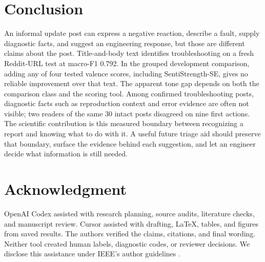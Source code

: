 \documentclass[conference,letterpaper]{IEEEtran}
\begin{document}
\section{Conclusion}
An informal update post can express a negative reaction, describe a fault, supply diagnostic facts, and suggest an engineering response, but those are different claims about the post. Title-and-body text identifies troubleshooting on a fresh Reddit-URL test at macro-F1 0.792. In the grouped development comparison, adding any of four tested valence scores, including SentiStrength-SE, gives no reliable improvement over that text. The apparent tone gap depends on both the comparison class and the scoring tool. Among confirmed troubleshooting posts, diagnostic facts such as reproduction context and error evidence are often not visible; two readers of the same 30 intact posts disagreed on nine first actions. The scientific contribution is this measured boundary between recognizing a report and knowing what to do with it. A useful future triage aid should preserve that boundary, surface the evidence behind each suggestion, and let an engineer decide what information is still needed.

\section*{Acknowledgment}
OpenAI Codex assisted with research planning, source audits, literature checks, and manuscript review. Cursor assisted with drafting, LaTeX, tables, and figures from saved results. The authors verified the claims, citations, and final wording. Neither tool created human labels, diagnostic codes, or reviewer decisions. We disclose this assistance under IEEE's author guidelines \cite{IEEE2024AIText}.



\end{document}
